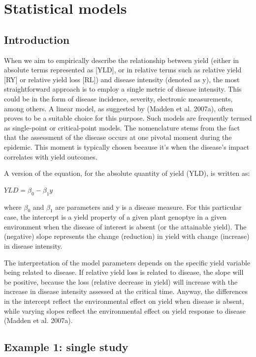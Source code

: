 \documentclass[
  letterpaper,
]{book}
\begin{document}
\hypertarget{statistical-models}{%
\chapter{Statistical models}\label{statistical-models}}

\hypertarget{introduction-4}{%
\section{Introduction}\label{introduction-4}}

When we aim to empirically describe the relationship between yield
(either in absolute terms represented as {[}YLD{]}, or in relative terms
such as relative yield {[}RY{]} or relative yield loss {[}RL{]}) and
disease intensity (denoted as y), the most straightforward approach is
to employ a single metric of disease intensity. This could be in the
form of disease incidence, severity, electronic measurements, among
others. A linear model, as suggested by (Madden et al. 2007a), often
proves to be a suitable choice for this purpose. Such models are
frequently termed as single-point or critical-point models. The
nomenclature stems from the fact that the assessment of the disease
occurs at one pivotal moment during the epidemic. This moment is
typically chosen because it's when the disease's impact correlates with
yield outcomes.

A version of the equation, for the absolute quantity of yield (YLD), is
written as:

\(YLD = 𝛽_0 - 𝛽_1y\)

where \(𝛽_0\) and \(𝛽_1\) are parameters and y is a disease measure. For
this particular case, the intercept is a yield property of a given plant
genoptye in a given environment when the disease of interest is absent
(or the attainable yield). The (negative) slope represents the change
(reduction) in yield with change (increase) in disease intensity.

The interpretation of the model parameters depends on the specific yield
variable being related to disease. If relative yield loss is related to
disease, the slope will be positive, because the loss (relative decrease
in yield) will increase with the increase in disease intensity assessed
at the critical time. Anyway, the differences in the intercept reflect
the environmental effect on yield when disease is absent, while varying
slopes reflect the environmental effect on yield response to disease
(Madden et al. 2007a).

\hypertarget{example-1-single-study}{%
\section{Example 1: single study}\label{example-1-single-study}}
\end{document}
